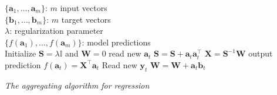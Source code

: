 \begin{algorithm}[ht]
\begin{algorithmic}[1]
\REQUIRE $\,$ \\
$\{\mathbf{a}_1,\dots,\mathbf{a}_{m} \}$: $m$ input vectors \\
$\{\mathbf{b}_1,\dots,\mathbf{b}_{m} \}$: $m$ target vectors \\
$\lambda$: regularization parameter \\
\ENSURE  $\,$ \\
$\{f(\mathbf{a}_1),\dots,f(\mathbf{a}_{m}) \}$: model predictions \\
\STATE Initialize $\mathbf{S}=\lambda \mathbb{I}$
and $\mathbf{W}=0$
	\STATE read new $\mathbf{a}_t$
   	\STATE $\mathbf{S} = \mathbf{S} + \mathbf{a}_t \mathbf{a}_t^\intercal$
	\STATE $\mathbf{X}=\mathbf{S}^{-1}\mathbf{W}$
	\STATE output prediction $f(\mathbf{a}_t) = \mathbf{X}^\intercal \mathbf{a}_t$
   	\STATE Read new $\mathbf{y}_t$
    	\STATE $\mathbf{W} = \mathbf{W} + \mathbf{a}_t \mathbf{b}_t$
\ENDFOR
\end{algorithmic}
\caption{{\em The aggregating algorithm for regression}}
\label{alg:AAR}
\end{algorithm}
